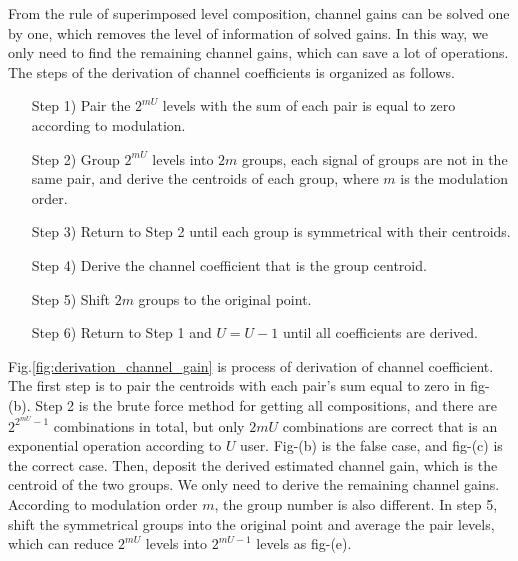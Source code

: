 From the rule of superimposed level composition,  channel gains can be solved one by one, which removes the level of information of solved gains. In this way, we only need to find the remaining channel gains, which can save a lot of operations. The steps of the derivation of channel coefficients is organized as follows.


\begin{enumerate}[leftmargin=\leftmargin+\widthof{Prefix}]
\item[Step 1)] Pair the $2^{mU}$ levels with the sum of each pair is equal to zero according to modulation.
\item[Step 2)] Group $2^{mU}$ levels into $2m$ groups, each signal of groups are not in the same pair, and derive the centroids of each group, where $m$ is the modulation order.
\item[Step 3)] Return to Step 2 until each group is symmetrical with their centroids.
\item[Step 4)] Derive the channel coefficient that is the group centroid.
\item[Step 5)] Shift $2m$ groups to the original point.
\item[Step 6)] Return to Step 1 and $U=U-1$ until all coefficients are derived.
\end{enumerate}

Fig.\ref{fig:derivation_channel_gain} is process of derivation of channel coefficient. The first step is to pair the centroids with each pair's sum equal to zero in fig-(b).  Step 2 is the brute force method for getting all compositions, and there are $2^{2^{mU}-1}$ combinations in total, but only $2mU$ combinations are correct that is an exponential operation according to $U$ user. Fig-(b) is the false case, and fig-(c) is the correct case. Then, deposit the derived estimated channel gain, which is the centroid of the two groups. We only need to derive the remaining channel gains. According to modulation order $m$, the group number is also different. In step 5, shift the symmetrical groups into the original point and average the pair levels, which can reduce $2^{mU}$ levels into $2^{mU-1}$ levels as fig-(e).


